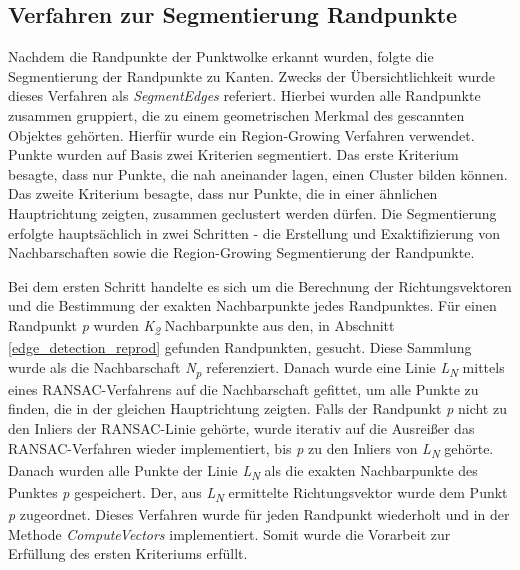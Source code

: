 \subsection{Verfahren zur Segmentierung Randpunkte} \label{edge_segmentation}
Nachdem die Randpunkte der Punktwolke erkannt wurden, folgte die Segmentierung der Randpunkte zu Kanten. Zwecks der Übersichtlichkeit wurde dieses Verfahren als \textit{SegmentEdges} referiert. Hierbei wurden alle Randpunkte zusammen gruppiert, die zu einem geometrischen Merkmal des gescannten Objektes gehörten. Hierfür wurde ein Region-Growing Verfahren verwendet. Punkte wurden auf Basis zwei Kriterien segmentiert. Das erste Kriterium besagte, dass nur Punkte, die nah aneinander lagen, einen Cluster bilden können. Das zweite Kriterium besagte, dass nur Punkte, die in einer ähnlichen Hauptrichtung zeigten, zusammen geclustert werden dürfen. Die Segmentierung erfolgte hauptsächlich in zwei Schritten - die Erstellung und Exaktifizierung von Nachbarschaften sowie die Region-Growing Segmentierung der Randpunkte.

Bei dem ersten Schritt handelte es sich um die Berechnung der Richtungsvektoren und die Bestimmung der exakten Nachbarpunkte jedes Randpunktes. Für einen Randpunkt \textit{p} wurden \textit{K\textsubscript{2}} Nachbarpunkte aus den, in Abschnitt \ref{edge_detection_reprod} gefunden Randpunkten, gesucht. Diese Sammlung wurde als die Nachbarschaft \textit{N\textsubscript{p}} referenziert. Danach wurde eine Linie \textit{L\textsubscript{N}} mittels eines RANSAC-Verfahrens auf die Nachbarschaft gefittet, um alle Punkte zu finden, die in der gleichen Hauptrichtung zeigten. Falls der Randpunkt \textit{p} nicht zu den Inliers der RANSAC-Linie gehörte, wurde iterativ auf die Ausreißer das RANSAC-Verfahren wieder implementiert, bis \textit{p} zu den Inliers von \textit{L\textsubscript{N}} gehörte. Danach wurden alle Punkte der Linie \textit{L\textsubscript{N}} als die exakten Nachbarpunkte des Punktes \textit{p} gespeichert. Der, aus \textit{L\textsubscript{N}} ermittelte Richtungsvektor wurde dem Punkt \textit{p} zugeordnet. Dieses Verfahren wurde für jeden Randpunkt wiederholt und in der Methode \textit{ComputeVectors} implementiert. Somit wurde die Vorarbeit zur Erfüllung des ersten Kriteriums erfüllt.

